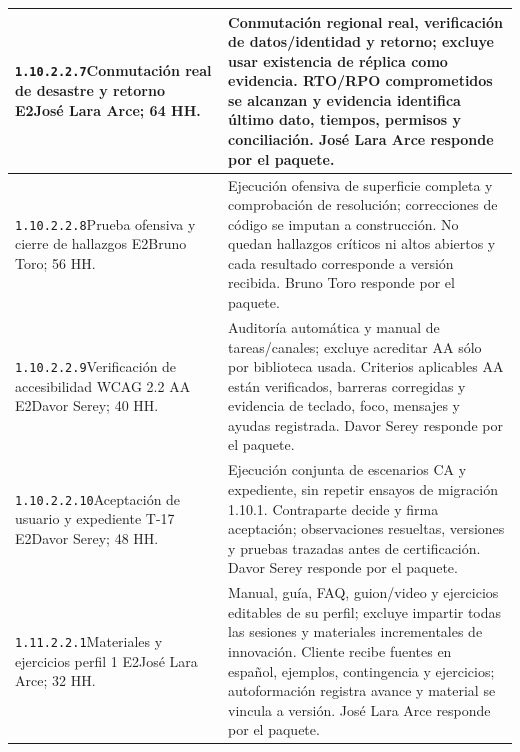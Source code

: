 \begin{longtable}{L{52mm}L{91mm}}
\texttt{1.\allowbreak{}10.\allowbreak{}2.\allowbreak{}2.\allowbreak{}7}\newline Conmutación real de desastre y retorno E2\newline José Lara Arce; 64 HH. & Conmutación regional real, verificación de datos/identidad y retorno; excluye usar existencia de réplica como evidencia. RTO/RPO comprometidos se alcanzan y evidencia identifica último dato, tiempos, permisos y conciliación. José Lara Arce responde por el paquete.\\\hline
\texttt{1.\allowbreak{}10.\allowbreak{}2.\allowbreak{}2.\allowbreak{}8}\newline Prueba ofensiva y cierre de hallazgos E2\newline Bruno Toro; 56 HH. & Ejecución ofensiva de superficie completa y comprobación de resolución; correcciones de código se imputan a construcción. No quedan hallazgos críticos ni altos abiertos y cada resultado corresponde a versión recibida. Bruno Toro responde por el paquete.\\\hline
\texttt{1.\allowbreak{}10.\allowbreak{}2.\allowbreak{}2.\allowbreak{}9}\newline Verificación de accesibilidad WCAG 2.2 AA E2\newline Davor Serey; 40 HH. & Auditoría automática y manual de tareas/canales; excluye acreditar AA sólo por biblioteca usada. Criterios aplicables AA están verificados, barreras corregidas y evidencia de teclado, foco, mensajes y ayudas registrada. Davor Serey responde por el paquete.\\\hline
\texttt{1.\allowbreak{}10.\allowbreak{}2.\allowbreak{}2.\allowbreak{}10}\newline Aceptación de usuario y expediente T-17 E2\newline Davor Serey; 48 HH. & Ejecución conjunta de escenarios CA y expediente, sin repetir ensayos de migración 1.10.1. Contraparte decide y firma aceptación; observaciones resueltas, versiones y pruebas trazadas antes de certificación. Davor Serey responde por el paquete.\\\hline
\texttt{1.\allowbreak{}11.\allowbreak{}2.\allowbreak{}2.\allowbreak{}1}\newline Materiales y ejercicios perfil 1 E2\newline José Lara Arce; 32 HH. & Manual, guía, FAQ, guion/video y ejercicios editables de su perfil; excluye impartir todas las sesiones y materiales incrementales de innovación. Cliente recibe fuentes en español, ejemplos, contingencia y ejercicios; autoformación registra avance y material se vincula a versión. José Lara Arce responde por el paquete.\\\hline

\end{longtable}
